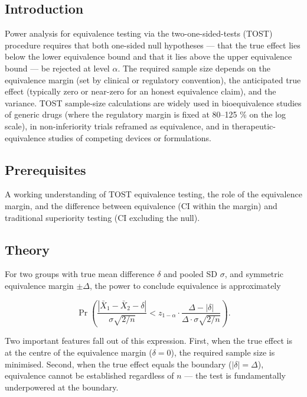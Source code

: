 \documentclass[
]{article}
\author{}
\date{\vspace{-2.5em}}
\begin{document}
\subsection{Introduction}\label{introduction}

Power analysis for equivalence testing via the two-one-sided-tests
(TOST) procedure requires that both one-sided null hypotheses --- that
the true effect lies below the lower equivalence bound and that it lies
above the upper equivalence bound --- be rejected at level \(\alpha\).
The required sample size depends on the equivalence margin (set by
clinical or regulatory convention), the anticipated true effect
(typically zero or near-zero for an honest equivalence claim), and the
variance. TOST sample-size calculations are widely used in
bioequivalence studies of generic drugs (where the regulatory margin is
fixed at 80--125 \% on the log scale), in non-inferiority trials
reframed as equivalence, and in therapeutic-equivalence studies of
competing devices or formulations.

\subsection{Prerequisites}\label{prerequisites}

A working understanding of TOST equivalence testing, the role of the
equivalence margin, and the difference between equivalence (CI within
the margin) and traditional superiority testing (CI excluding the null).

\subsection{Theory}\label{theory}

For two groups with true mean difference \(\delta\) and pooled SD
\(\sigma\), and symmetric equivalence margin \(\pm \Delta\), the power
to conclude equivalence is approximately

\[\Pr\!\left(\frac{|\bar X_1 - \bar X_2 - \delta|}{\sigma \sqrt{2/n}} < z_{1-\alpha} \cdot \frac{\Delta - |\delta|}{\Delta \cdot \sigma \sqrt{2/n}}\right).\]

Two important features fall out of this expression. First, when the true
effect is at the centre of the equivalence margin (\(\delta = 0\)), the
required sample size is minimised. Second, when the true effect equals
the boundary (\(|\delta| = \Delta\)), equivalence cannot be established
regardless of \(n\) --- the test is fundamentally underpowered at the
boundary.
\end{document}
